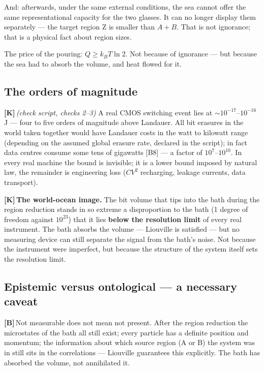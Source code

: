 \documentclass[11pt,a4paper]{article}
\newcommand{\LK}{\textcolor{layK}{\textbf{\footnotesize\textsf{[K]}}}\,}
\newcommand{\LB}{\textcolor{layB}{\textbf{\footnotesize\textsf{[B]}}}\,}
\newcommand{\pruef}[1]{{\small\itshape(check script, #1)}}
\begin{document}
And: afterwards, under the same external conditions, the sea cannot offer the same
representational capacity for the two glasses. It can no longer display them
separately --- the target region Z is smaller than $A+B$. That is not ignorance;
that is a physical fact about region sizes.

The price of the pouring: $Q \ge k_B T \ln 2$. Not because of ignorance --- but
because the sea had to absorb the volume, and heat flowed for it.

\subsection{The orders of magnitude}

\LK \pruef{checks 2--3} A real CMOS switching event lies at
${\sim}10^{-17}$--$10^{-16}$\,J --- four to five orders of magnitude above
Landauer. All bit erasures in the world taken together would have Landauer costs
in the watt to kilowatt range (depending on the assumed global erasure rate,
declared in the script); in fact data centres consume some tens of gigawatts [B8]
--- a factor of $10^{7}$--$10^{10}$. In every real machine the bound is invisible;
it is a lower bound imposed by natural law, the remainder is engineering loss
($CV^2$ recharging, leakage currents, data transport).

\LK \textbf{The world-ocean image.} The bit volume that tips into the bath during
the region reduction stands in so extreme a disproportion to the bath (1 degree of
freedom against $10^{23}$) that it lies \textbf{below the resolution limit} of
every real instrument. The bath absorbs the volume --- Liouville is satisfied ---
but no measuring device can still separate the signal from the bath's noise. Not
because the instrument were imperfect, but because the structure of the system
itself sets the resolution limit.

\subsection{Epistemic versus ontological --- a necessary caveat}

\LB Not measurable does not mean not present. After the region reduction the
microstates of the bath all still exist; every particle has a definite position
and momentum; the information about which source region (A or B) the system was in
still sits in the correlations --- Liouville guarantees this explicitly. The bath
has absorbed the volume, not annihilated it.
\end{document}
